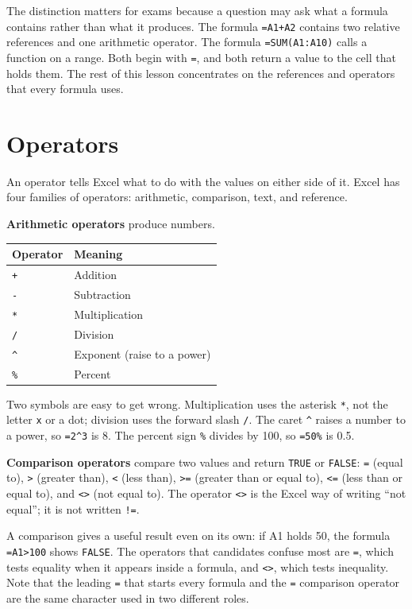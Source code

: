 The distinction matters for exams because a question may ask what a formula
contains rather than what it produces. The formula \texttt{=A1+A2} contains
two relative references and one arithmetic operator. The formula
\texttt{=SUM(A1:A10)} calls a function on a range. Both begin with \texttt{=},
and both return a value to the cell that holds them. The rest of this lesson
concentrates on the references and operators that every formula uses.

\section{Operators}
An operator tells Excel what to do with the values on either side of it.
Excel has four families of operators: arithmetic, comparison, text, and
reference.

\textbf{Arithmetic operators} produce numbers.

\begin{center}
\begin{tabular}{p{}p{}}
\toprule
\textbf{Operator} & \textbf{Meaning} \\
\midrule
\texttt{+} & Addition \\
\texttt{-} & Subtraction \\
\texttt{*} & Multiplication \\
\texttt{/} & Division \\
\texttt{\textasciicircum} & Exponent (raise to a power) \\
\texttt{\%} & Percent \\
\bottomrule
\end{tabular}
\end{center}

Two symbols are easy to get wrong. Multiplication uses the asterisk
\texttt{*}, not the letter \texttt{x} or a dot; division uses the forward
slash \texttt{/}. The caret \texttt{\textasciicircum} raises a number to a
power, so \texttt{=2\textasciicircum3} is 8. The percent sign \texttt{\%}
divides by 100, so \texttt{=50\%} is 0.5.

\textbf{Comparison operators} compare two values and return \texttt{TRUE} or
\texttt{FALSE}: \texttt{=} (equal to), \texttt{>} (greater than), \texttt{<}
(less than), \texttt{>=} (greater than or equal to), \texttt{<=} (less than or
equal to), and \texttt{<>} (not equal to). The operator \texttt{<>} is the
Excel way of writing ``not equal''; it is not written \texttt{!=}.

A comparison gives a useful result even on its own: if A1 holds 50, the
formula \texttt{=A1>100} shows \texttt{FALSE}. The operators that candidates
confuse most are \texttt{=}, which tests equality when it appears inside a
formula, and \texttt{<>}, which tests inequality. Note that the leading
\texttt{=} that starts every formula and the \texttt{=} comparison operator
are the same character used in two different roles.

